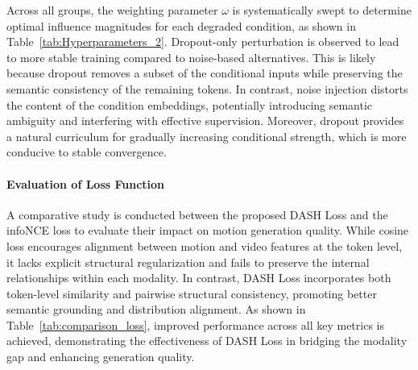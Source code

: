 \documentclass[a4paper,12pt]{article}
\begin{document}
Across all groups, the weighting parameter $\omega$ is systematically swept to determine optimal influence magnitudes for each degraded condition, as shown in Table~\ref{tab:Hyperparameters_2}. Dropout-only perturbation is observed to lead to more stable training compared to noise-based alternatives. This is likely because dropout removes a subset of the conditional inputs while preserving the semantic consistency of the remaining tokens. In contrast, noise injection distorts the content of the condition embeddings, potentially introducing semantic ambiguity and interfering with effective supervision. Moreover, dropout provides a natural curriculum for gradually increasing conditional strength, which is more conducive to stable convergence.

\paragraph{Evaluation of Loss Function}
A comparative study is conducted between the proposed DASH Loss and the infoNCE loss to evaluate their impact on motion generation quality. While cosine loss encourages alignment between motion and video features at the token level, it lacks explicit structural regularization and fails to preserve the internal relationships within each modality. In contrast, DASH Loss incorporates both token-level similarity and pairwise structural consistency, promoting better semantic grounding and distribution alignment. As shown in Table~\ref{tab:comparison_loss}, improved performance across all key metrics is achieved, demonstrating the effectiveness of DASH Loss in bridging the modality gap and enhancing generation quality.
\end{document}

